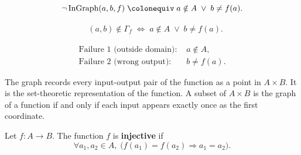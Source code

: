 \begin{remark*}
\[
\neg \operatorname{InGraph}(a,b,f)
\;\colonequiv\;
a \notin A
\;\lor\;
b \ne f(a).
\]
\end{remark*}

\begin{remark*}
\[
\begin{aligned}
&(a,b) \notin \Gamma_f
\;\Longleftrightarrow\;
a \notin A
\;\lor\;
b \ne f(a).
\end{aligned}
\]
\end{remark*}

\begin{remark*}
\[
\begin{aligned}
\text{Failure 1 (outside domain): } 
&a \notin A, \\
\text{Failure 2 (wrong output): } 
&b \ne f(a).
\end{aligned}
\]
\end{remark*}

\begin{remark*}[Interpretation]
The graph records every input-output pair of the function as a point
in $A \times B$. It is the set-theoretic representation of the function.
A subset of $A \times B$ is the graph of a function if and only if
each input appears exactly once as the first coordinate.
\end{remark*}















\begin{tcolorbox}[title={Definition --- Injective}]
\begin{definition}[Injective]
\label{def:alg-injective}
Let $f : A \to B$. The function $f$ is \textbf{injective} if
\[
\forall a_1, a_2 \in A,\;
\bigl(f(a_1) = f(a_2) \Rightarrow a_1 = a_2\bigr).
\]
\end{definition}
\end{tcolorbox}

